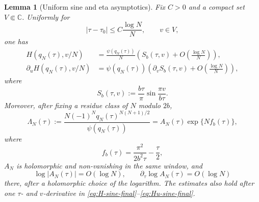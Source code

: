\documentclass[10pt,a4paper]{amsart}
\newtheorem{lemma}{Lemma}
\newcommand{\C}{\mathbb C}
\begin{document}
\begin{lemma}[Uniform sine and eta asymptotics]\label{lem:cusp-asymptotics-final}
Fix $C>0$ and a compact set $V\Subset\C$.  Uniformly for
\[
        |\tau-\tau_0|\le C\frac{\log N}{N},
        \qquad v\in V,
\]
one has
\begin{align}
        H(q_N(\tau),v/N)
        &=\frac{\psi(q_N(\tau))}{N}
          \left(S_b(\tau,v)+O\left(\frac{\log N}{N}\right)\right),\label{eq:H-sine-final}\\
        \partial_uH(q_N(\tau),v/N)
        &=\psi(q_N(\tau))
          \left(\partial_vS_b(\tau,v)+O\left(\frac{\log N}{N}\right)\right),\label{eq:Hu-sine-final}
\end{align}
where
\begin{equation}\label{eq:Sb-final-def}
        S_b(\tau,v):=\frac{b\tau}{\pi}\sin\frac{\pi v}{b\tau}.
\end{equation}
Moreover, after fixing a residue class of $N$ modulo $2b$,
\begin{equation}\label{eq:Lambda-final-asym}
        \Lambda_N(\tau):=\frac{N(-1)^Nq_N(\tau)^{N(N+1)/2}}{\psi(q_N(\tau))}
        =A_N(\tau)\exp\{Nf_b(\tau)\},
\end{equation}
where
\begin{equation}\label{eq:fb-def}
        f_b(\tau)=\frac{\pi^2}{2b^2\tau}-\frac{\tau}{2},
\end{equation}
$A_N$ is holomorphic and non-vanishing in the same window, and
\begin{equation}\label{eq:AN-bound}
        \log |A_N(\tau)|=O(\log N),
        \qquad
        \partial_\tau\log A_N(\tau)=O(\log N)
\end{equation}
there, after a holomorphic choice of the logarithm.  The estimates also hold after one $\tau$- and $v$-derivative in \eqref{eq:H-sine-final}--\eqref{eq:Hu-sine-final}.
\end{lemma}
\end{document}
